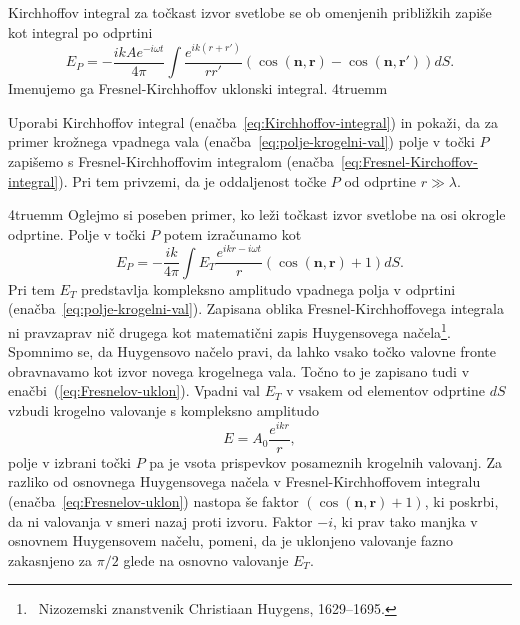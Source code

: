 Kirchhoffov integral za točkast izvor svetlobe se ob omenjenih približkih 
zapiše kot integral po odprtini
\begin{equation}
E_P = -\frac{ik A e^{-i\omega t}}{4\pi}\int\frac{e^{ik(r+r')}}{rr'}\left(\cos(\mathbf{n},
\mathbf{r})-\cos(\mathbf{n},\mathbf{r'})\right) dS.
\label{eq:Fresnel-Kirchoffov-integral}
\end{equation}
Imenujemo ga Fresnel-Kirchhoffov uklonski integral.
\vglue4truemm
\begin{definition}
\label{naloga-Fresnel-Kirchhoff-uklon}
Uporabi Kirchhoffov integral (enačba~\ref{eq:Kirchhoffov-integral}) in pokaži, da 
za primer krožnega vpadnega vala (enačba~\ref{eq:polje-krogelni-val}) polje v točki 
$P$ zapišemo s Fresnel-Kirchhoffovim integralom (enačba~\ref{eq:Fresnel-Kirchoffov-integral}). 
Pri tem privzemi, da je oddaljenost točke $P$ od odprtine $r \gg \lambda$.
\end{definition}
\vglue4truemm
Oglejmo si poseben primer, ko leži točkast izvor svetlobe na osi okrogle odprtine. Polje 
v točki $P$ potem izračunamo kot 
\begin{equation}
\label{eq:Fresnelov-uklon}
E_P =  -\frac{ik}{4\pi} \int E_T\frac{ e^{ikr-i\omega t}}{r}\left(\cos(\mathbf{n},\mathbf{r})+1\right) dS.
\end{equation}
Pri tem $E_T$ predstavlja kompleksno amplitudo vpadnega polja v odprtini (enačba~\ref{eq:polje-krogelni-val}). 
Zapisana oblika Fresnel-Kirchhoffovega integrala ni pravzaprav nič drugega kot 
matematični zapis Huygensovega 
načela\footnote{~Nizozemski znanstvenik Christiaan Huygens, 1629--1695.}. 
Spomnimo se, da Huygensovo načelo pravi, da lahko vsako točko valovne fronte obravnavamo 
kot izvor novega krogelnega vala. Točno to je zapisano tudi v enačbi~(\ref{eq:Fresnelov-uklon}). 
Vpadni val
$E_T$ v vsakem od elementov odprtine $dS$ vzbudi krogelno valovanje s
kompleksno amplitudo
\begin{equation}
E = A_0 \frac{e^{ikr}}{r},
\end{equation} 
polje v izbrani točki $P$ pa je vsota prispevkov posameznih krogelnih valovanj.
Za razliko od osnovnega Huygensovega načela v Fresnel-Kirchhoffovem integralu 
(enačba~\ref{eq:Fresnelov-uklon})
nastopa še faktor $\left(\cos(\mathbf{n},\mathbf{r})+1\right)$, ki poskrbi, da ni valovanja 
v smeri nazaj proti izvoru. Faktor $-i$, ki prav tako manjka v osnovnem Huygensovem načelu,
pomeni, da je uklonjeno valovanje fazno zakasnjeno za $\pi/2$ glede na osnovno
valovanje $E_T$.

